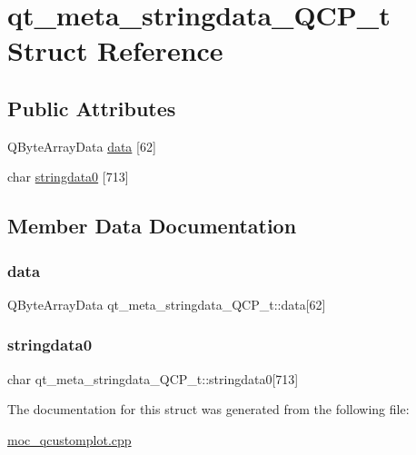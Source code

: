 \hypertarget{structqt__meta__stringdata__QCP__t}{}\section{qt\+\_\+meta\+\_\+stringdata\+\_\+\+Q\+C\+P\+\_\+t Struct Reference}
\label{structqt__meta__stringdata__QCP__t}
\subsection*{Public Attributes}
\begin{DoxyCompactItemize}
\item 
Q\+Byte\+Array\+Data \mbox{\hyperlink{structqt__meta__stringdata__QCP__t_abc9c399ac75b9d32e347271273ccd5b6}{data}} \mbox{[}62\mbox{]}
\item 
char \mbox{\hyperlink{structqt__meta__stringdata__QCP__t_a884365a57221bf71e4c60c1e2a9fc5f2}{stringdata0}} \mbox{[}713\mbox{]}
\end{DoxyCompactItemize}


\subsection{Member Data Documentation}
\mbox{\label{structqt__meta__stringdata__QCP__t_abc9c399ac75b9d32e347271273ccd5b6}} 
\subsubsection{\texorpdfstring{data}{data}}
{\footnotesize\ttfamily Q\+Byte\+Array\+Data qt\+\_\+meta\+\_\+stringdata\+\_\+\+Q\+C\+P\+\_\+t\+::data\mbox{[}62\mbox{]}}

\mbox{\label{structqt__meta__stringdata__QCP__t_a884365a57221bf71e4c60c1e2a9fc5f2}} 
\subsubsection{\texorpdfstring{stringdata0}{stringdata0}}
{\footnotesize\ttfamily char qt\+\_\+meta\+\_\+stringdata\+\_\+\+Q\+C\+P\+\_\+t\+::stringdata0\mbox{[}713\mbox{]}}



The documentation for this struct was generated from the following file\+:\begin{DoxyCompactItemize}
\item 
\mbox{\hyperlink{moc__qcustomplot_8cpp}{moc\+\_\+qcustomplot.\+cpp}}\end{DoxyCompactItemize}
